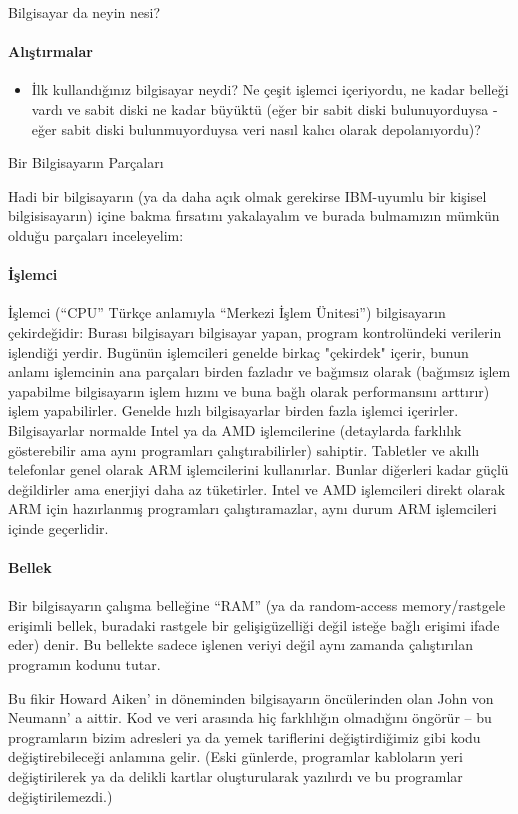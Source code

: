 \documentclass[10pt,a5paper]{book}
\begin{document}
\begin{section}{Bilgisayar da neyin nesi?}
\paragraph{Alıştırmalar}{
\begin{itemize}
 \item İlk kullandığınız bilgisayar neydi? Ne çeşit işlemci içeriyordu, ne kadar belleği vardı ve sabit diski ne kadar büyüktü (eğer bir sabit diski bulunuyorduysa - eğer sabit diski bulunmuyorduysa veri nasıl kalıcı olarak depolanıyordu)?
\end{itemize}}
\end{section}

\begin{section}{Bir Bilgisayarın Parçaları}

Hadi bir bilgisayarın (ya da daha açık olmak gerekirse IBM-uyumlu bir kişisel bilgisisayarın) içine bakma fırsatını yakalayalım ve burada bulmamızın mümkün olduğu parçaları inceleyelim:
\paragraph{İşlemci}{İşlemci (“CPU” Türkçe anlamıyla “Merkezi İşlem Ünitesi”) bilgisayarın çekirdeğidir: Burası bilgisayarı bilgisayar yapan, program kontrolündeki verilerin işlendiği yerdir. Bugünün işlemcileri genelde birkaç "çekirdek" içerir, bunun anlamı işlemcinin ana parçaları birden fazladır ve bağımsız olarak (bağımsız işlem yapabilme bilgisayarın işlem hızını ve buna bağlı olarak performansını arttırır) işlem yapabilirler.  Genelde hızlı bilgisayarlar birden fazla işlemci içerirler. Bilgisayarlar normalde Intel ya da AMD işlemcilerine (detaylarda farklılık gösterebilir ama aynı programları çalıştırabilirler) sahiptir. Tabletler ve akıllı telefonlar genel olarak ARM işlemcilerini kullanırlar. Bunlar diğerleri kadar güçlü değildirler ama enerjiyi daha az tüketirler. Intel ve AMD işlemcileri direkt olarak ARM için hazırlanmış programları çalıştıramazlar, aynı durum ARM işlemcileri içinde geçerlidir.}
\paragraph{Bellek}{Bir bilgisayarın çalışma belleğine “RAM” (ya da random-access memory/rastgele erişimli bellek, buradaki rastgele bir gelişigüzelliği değil isteğe bağlı erişimi ifade eder) denir. Bu bellekte sadece işlenen veriyi değil aynı zamanda çalıştırılan programın kodunu tutar.}

Bu fikir Howard Aiken' in döneminden bilgisayarın öncülerinden olan John von Neumann' a aittir. Kod ve veri arasında hiç farklılığın olmadığını öngörür – bu programların bizim adresleri ya da yemek tariflerini değiştirdiğimiz gibi kodu değiştirebileceği anlamına gelir. (Eski günlerde, programlar kabloların yeri değiştirilerek ya da delikli kartlar oluşturularak yazılırdı ve bu programlar değiştirilemezdi.)


\end{section}
\end{document}
